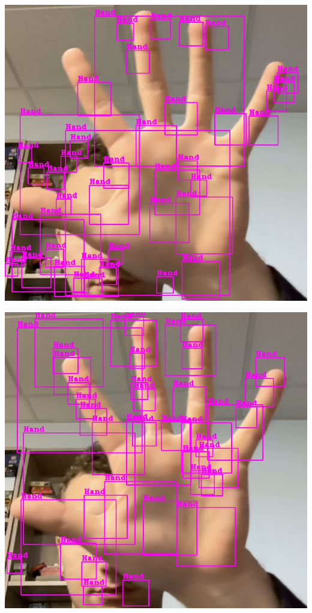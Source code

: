 \documentclass[11pt]{article}
\begin{document}
\begin{minipage}{0.45\textwidth}
    \centering
    \includegraphics[width=\textwidth]{images/cascade6.png}
    \label{fig:res_cascade6}
\end{minipage}
\begin{minipage}{0.45\textwidth}
    \centering
    \includegraphics[width=\textwidth]{images/cascade7.png}
    \label{fig:res_cascade7}
\end{minipage}
\end{document}

